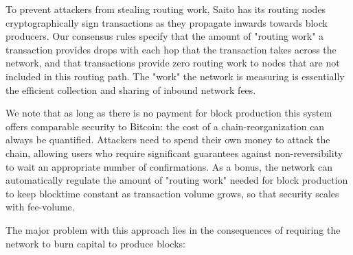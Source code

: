 \documentclass[11pt, oneside]{article}   	%
\begin{document}
\begin{multicols}{2}

To prevent attackers from stealing routing work, Saito has its routing nodes cryptographically sign transactions as they propagate inwards towards block producers. Our consensus rules specify that the amount of "routing work" a transaction provides drops with each hop that the transaction takes across the network, and that transactions provide zero routing work to nodes that are not included in this routing path. The "work" the network is measuring is essentially the efficient collection and sharing of inbound network fees.

We note that as long as there is no payment for block production this system offers comparable security to Bitcoin: the cost of a chain-reorganization can always be quantified. Attackers need to spend their own money to attack the chain, allowing users who require significant guarantees against non-reversibility to wait an appropriate number of confirmations. As a bonus, the network can automatically regulate the amount of "routing work" needed for block production to keep blocktime constant as transaction volume grows, so that security scales with fee-volume.

The major problem with this approach lies in the consequences of requiring the network to burn capital to produce blocks:



\end{multicols}
\end{document}
